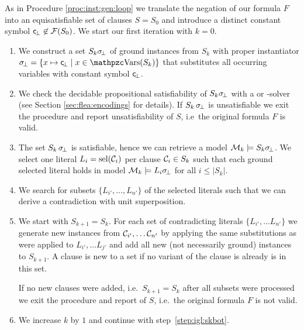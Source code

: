 \begin{procedure}\label{proc:inst:gen:eq:loop}
	As in Procedure \vref{proc:inst:gen:loop} we translate the 
	negation of our formula \( F \) 
	into an equisatisfiable set of clauses
	\( S = S_0 \) and introduce a distinct constant symbol
	\( \mathsf{c} \!_\bot\not\in\mathcal{F}(S_0) \).
	We start our first iteration with \( k=0 \).

	\begin{enumerate}
		\item\label{step:igl:eq:skbot}
		We construct a set \( S_{k}\sigma \!_\bot \) of ground instances from \( S_k \)
		with proper instantiator \( \subsbot = \{ x\mapsto \consbot \mid x\in\var(S_k) \} \)
		that substitutes all occurring variables with constant symbol \( \mathsf{c} \!_\bot \).
%
		\item\label{step:igl:eq:sksat} 
		We check the decidable propositional satisfiability of
		\( S_k\sigma \!_\bot \) with a \SAT{} or \SMT{}-solver
		(see Section \vref{sec:flea:encodings} for details).
		If \( S_k \, \sigma \!_\bot \) is unsatisfiable
		we exit the procedure 
		and report
		{ unsatisfiability} of \( S \), i.e~the original formula \( F \) is valid.

		\item\label{step:igl:eq:model} The set \( S_k \, \sigma \!_\bot \) is satisfiable, hence we can retrieve a model \( \mathcal{M}_k \models S_k\sigma \!_\bot \).
		We select one literal \( L_i = \operatorname{sel}(\mathcal{C}_i) \) per clause \( \mathcal{C}_i \in S_k \)
		such that each ground selected literal holds in model
		\( \mathcal{M}_k\models L_i\sigma \!_\bot \) for all \( i \leq | S_k | \).

		\item\label{step:igl:eq:false} We search for subsets 
		\( \{ L_{i'}, \ldots, L_{n'} \} \) of the selected literals
		such that we can derive a contradiction with unit superposition.

		\item We start with \( S_{k+1} = S_k \). For each set of contradicting literals
		\( \{ L_{i'}, \ldots L_{n'} \} \)
		we generate new instances from \( \mathcal{C}_{i'}, \ldots \mathcal{C}_{n'} \)
		by applying the same substitutions as were applied 
		to \( L_{i'}, \ldots L_{j'} \) 
		and add all new (not necessarily ground) instances to \( S_{k+1} \).
		A clause is new to a set if no variant of the clause is already is in this set.

		If no new clauses were added, i.e.~\( S_{k+1} = S_k \) after all subsets were processed we exit the procedure and report  of \( S \), i.e.~the original formula \( F \) is not valid.

		\item We increase \( k \) by \( 1 \) and continue with step~\ref{step:igl:skbot}.

	\end{enumerate}
\end{procedure}

